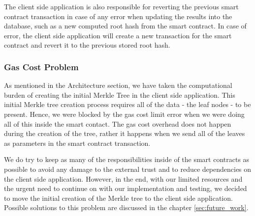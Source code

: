 The client side application is also responsible for reverting the previous smart contract transaction in case of any error when updating the results into the database, such as a new computed root hash from the smart contract. In case of error, the client side application will create a new transaction for the smart contract and revert it to the previous stored root hash.

\subsubsection*{Gas Cost Problem}

As mentioned in the Architecture section, we have taken the computational burden of creating the initial Merkle Tree in the client side application. This initial Merkle tree creation process requires all of the data - the leaf nodes - to be present. Hence, we were blocked by the gas cost limit error when we were doing all of this inside the smart contact. The gas cost overhead does not happen during the creation of the tree, rather it happens when we send all of the leaves as parameters in the smart contract transaction. 

We do try to keep as many of the responsibilities inside of the smart contracts as possible to avoid any damage to the external trust and to reduce dependencies on the client side application. However, in the end, with our limited resources and the urgent need to continue on with our implementation and testing, we decided to move the initial creation of the Merkle tree to the client side application. Possible solutions to this problem are discussed in the chapter \ref{sec:future_work}.